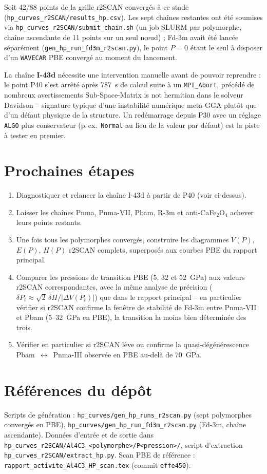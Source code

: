 \documentclass[11pt,a4paper]{article}
\begin{document}
Soit 42/88 points de la grille r2SCAN convergés à ce stade
(\texttt{hp\_curves\_r2SCAN/results\_hp.csv}). Les sept chaînes restantes ont été soumises via
\texttt{hp\_curves\_r2SCAN/submit\_chain.sh} (un job SLURM par polymorphe, chaîne ascendante de
11 points sur un seul nœud) ; Fd-3m avait été lancée séparément
(\texttt{gen\_hp\_run\_fd3m\_r2scan.py}), le point $P=0$ étant le seul à disposer d'un
\texttt{WAVECAR} PBE convergé au moment du lancement.

La chaîne \textbf{I-43d} nécessite une intervention manuelle avant de pouvoir reprendre : le
point P40 s'est arrêté après \SI{787}{\second} de calcul suite à un \texttt{MPI\_Abort}, précédé
de nombreux avertissements \og Sub-Space-Matrix is not hermitian \fg{} dans le solveur Davidson
-- signature typique d'une instabilité numérique meta-GGA plutôt que d'un défaut physique de la
structure. Un redémarrage depuis P30 avec un réglage \texttt{ALGO} plus conservateur (p.\,ex.\
\texttt{Normal} au lieu de la valeur par défaut) est la piste à tester en premier.

\section{Prochaines étapes}

\begin{enumerate}[label=(\roman*)]
  \item Diagnostiquer et relancer la chaîne I-43d à partir de P40 (voir ci-dessus).
  \item Laisser les chaînes Pnma, Pnma-VII, Pbam, R-3m et anti-CaFe$_2$O$_4$ achever leurs
  points restants.
  \item Une fois tous les polymorphes convergés, construire les diagrammes $V(P)$, $E(P)$,
  $H(P)$ r2SCAN complets, superposés aux courbes PBE du rapport principal.
  \item Comparer les pressions de transition PBE (5, 32 et 52~GPa) aux valeurs r2SCAN
  correspondantes, avec la même analyse de précision ($\delta P_t \approx \sqrt2\,\delta H /
  |\Delta V(P_t)|$) que dans le rapport principal -- en particulier vérifier si r2SCAN confirme
  la fenêtre de stabilité de Fd-3m entre Pnma-VII et Pbam (5--32~GPa en PBE), la transition la
  moins bien déterminée des trois.
  \item Vérifier en particulier si r2SCAN lève ou confirme la quasi-dégénérescence
  Pbam~$\leftrightarrow$~Pnma-III observée en PBE au-delà de 70~GPa.
\end{enumerate}

\appendix
\section{Références du dépôt}

Scripts de génération : \texttt{hp\_curves/gen\_hp\_runs\_r2scan.py} (sept polymorphes convergés
en PBE), \texttt{hp\_curves/gen\_hp\_run\_fd3m\_r2scan.py} (Fd-3m, chaîne ascendante). Données
d'entrée et de sortie dans \texttt{hp\_curves\_r2SCAN/Al4C3\_<polymorphe>/P<pression>/}, script
d'extraction \texttt{hp\_curves\_r2SCAN/extract\_hp.py}. Scan PBE de référence :
\texttt{rapport\_activite\_Al4C3\_HP\_scan.tex} (commit \texttt{effe450}).
\end{document}
